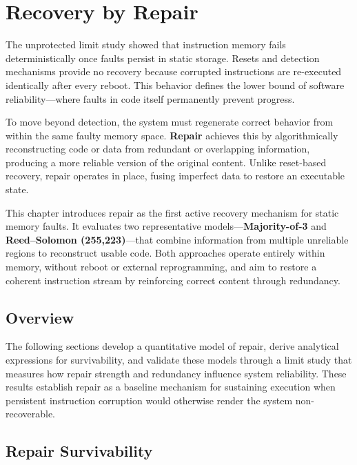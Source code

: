 \chapter{Recovery by Repair}
\label{chap:repair}

The unprotected limit study showed that instruction memory fails deterministically once faults persist in static storage. 
Resets and detection mechanisms provide no recovery because corrupted instructions are re-executed identically after every reboot. 
This behavior defines the lower bound of software reliability—where faults in code itself permanently prevent progress.  

To move beyond detection, the system must regenerate correct behavior from within the same faulty memory space. 
\textbf{Repair} achieves this by algorithmically reconstructing code or data from redundant or overlapping information, 
producing a more reliable version of the original content. 
Unlike reset-based recovery, repair operates in place, fusing imperfect data to restore an executable state.  

This chapter introduces repair as the first active recovery mechanism for static memory faults. 
It evaluates two representative models—\textbf{Majority-of-3} and \textbf{Reed–Solomon (255,223)}—that combine information from multiple unreliable regions to reconstruct usable code. 
Both approaches operate entirely within memory, without reboot or external reprogramming, and aim to restore a coherent instruction stream by reinforcing correct content through redundancy.  

\section{Overview}
\label{sec:repair-overview}

The following sections develop a quantitative model of repair, derive analytical expressions for survivability, 
and validate these models through a limit study that measures how repair strength and redundancy influence system reliability. 
These results establish repair as a baseline mechanism for sustaining execution when persistent instruction corruption 
would otherwise render the system non-recoverable.

\section{Repair Survivability}
\label{sec:repair-survivability}

